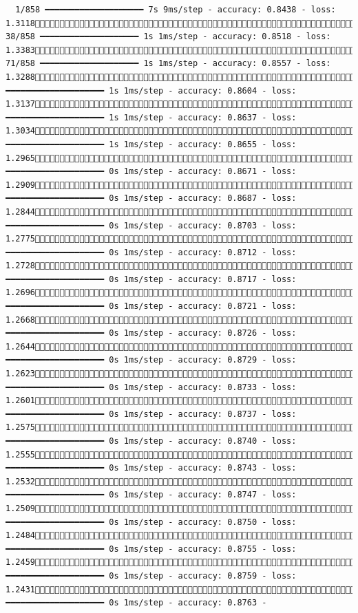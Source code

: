\documentclass[
  letterpaper,
  DIV=11,
  numbers=noendperiod]{scrartcl}
\begin{document}
\begin{verbatim}
  1/858 ━━━━━━━━━━━━━━━━━━━━ 7s 9ms/step - accuracy: 0.8438 - loss: 1.3118 38/858 ━━━━━━━━━━━━━━━━━━━━ 1s 1ms/step - accuracy: 0.8518 - loss: 1.3383 71/858 ━━━━━━━━━━━━━━━━━━━━ 1s 1ms/step - accuracy: 0.8557 - loss: 1.3288103/858 ━━━━━━━━━━━━━━━━━━━━ 1s 1ms/step - accuracy: 0.8604 - loss: 1.3137137/858 ━━━━━━━━━━━━━━━━━━━━ 1s 1ms/step - accuracy: 0.8637 - loss: 1.3034172/858 ━━━━━━━━━━━━━━━━━━━━ 1s 1ms/step - accuracy: 0.8655 - loss: 1.2965207/858 ━━━━━━━━━━━━━━━━━━━━ 0s 1ms/step - accuracy: 0.8671 - loss: 1.2909245/858 ━━━━━━━━━━━━━━━━━━━━ 0s 1ms/step - accuracy: 0.8687 - loss: 1.2844283/858 ━━━━━━━━━━━━━━━━━━━━ 0s 1ms/step - accuracy: 0.8703 - loss: 1.2775319/858 ━━━━━━━━━━━━━━━━━━━━ 0s 1ms/step - accuracy: 0.8712 - loss: 1.2728357/858 ━━━━━━━━━━━━━━━━━━━━ 0s 1ms/step - accuracy: 0.8717 - loss: 1.2696395/858 ━━━━━━━━━━━━━━━━━━━━ 0s 1ms/step - accuracy: 0.8721 - loss: 1.2668432/858 ━━━━━━━━━━━━━━━━━━━━ 0s 1ms/step - accuracy: 0.8726 - loss: 1.2644466/858 ━━━━━━━━━━━━━━━━━━━━ 0s 1ms/step - accuracy: 0.8729 - loss: 1.2623500/858 ━━━━━━━━━━━━━━━━━━━━ 0s 1ms/step - accuracy: 0.8733 - loss: 1.2601538/858 ━━━━━━━━━━━━━━━━━━━━ 0s 1ms/step - accuracy: 0.8737 - loss: 1.2575572/858 ━━━━━━━━━━━━━━━━━━━━ 0s 1ms/step - accuracy: 0.8740 - loss: 1.2555610/858 ━━━━━━━━━━━━━━━━━━━━ 0s 1ms/step - accuracy: 0.8743 - loss: 1.2532646/858 ━━━━━━━━━━━━━━━━━━━━ 0s 1ms/step - accuracy: 0.8747 - loss: 1.2509683/858 ━━━━━━━━━━━━━━━━━━━━ 0s 1ms/step - accuracy: 0.8750 - loss: 1.2484719/858 ━━━━━━━━━━━━━━━━━━━━ 0s 1ms/step - accuracy: 0.8755 - loss: 1.2459757/858 ━━━━━━━━━━━━━━━━━━━━ 0s 1ms/step - accuracy: 0.8759 - loss: 1.2431795/858 ━━━━━━━━━━━━━━━━━━━━ 0s 1ms/step - accuracy: 0.8763 - 
\end{verbatim}
\end{document}
